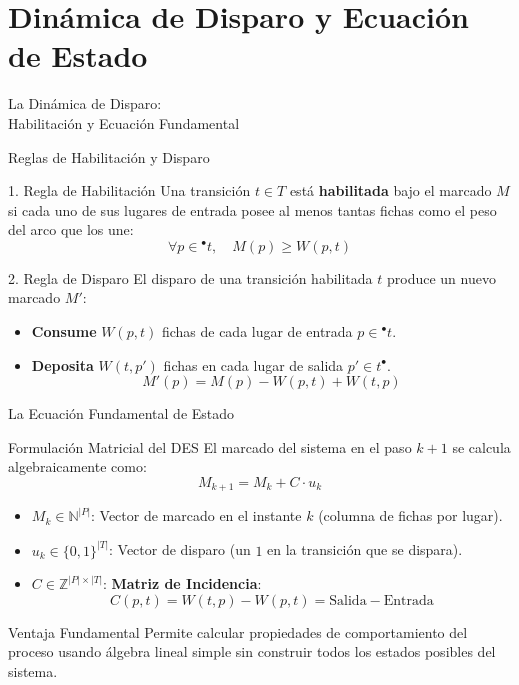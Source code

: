 \documentclass[10pt, aspectratio=169]{beamer}
\begin{document}
\section{Dinámica de Disparo y Ecuación de Estado}

\begin{frame}{}
	\centering
	\Huge{La Dinámica de Disparo: \\ Habilitación y Ecuación Fundamental}
\end{frame}

\begin{frame}{Reglas de Habilitación y Disparo}
	\begin{block}{1. Regla de Habilitación}
		Una transición $t \in T$ está \textbf{habilitada} bajo el marcado $M$ si cada uno de sus lugares de entrada posee al menos tantas fichas como el peso del arco que los une:
		\[ \forall p \in {}^\bullet t, \quad M(p) \ge W(p, t) \]
	\end{block}

	\begin{block}{2. Regla de Disparo}
		El disparo de una transición habilitada $t$ produce un nuevo marcado $M'$:
		\begin{itemize}
			\item \textbf{Consume} $W(p, t)$ fichas de cada lugar de entrada $p \in {}^\bullet t$.
			\item \textbf{Deposita} $W(t, p')$ fichas en cada lugar de salida $p' \in t^\bullet$.
			\[ M'(p) = M(p) - W(p, t) + W(t, p) \]
		\end{itemize}
	\end{block}
\end{frame}

\begin{frame}{La Ecuación Fundamental de Estado}
	\begin{block}{Formulación Matricial del DES}
		El marcado del sistema en el paso $k+1$ se calcula algebraicamente como:
		\[ M_{k+1} = M_k + C \cdot u_k \]
		\begin{itemize}
			\item $M_k \in \mathbb{N}^{|P|}$: Vector de marcado en el instante $k$ (columna de fichas por lugar).
			\item $u_k \in \{0, 1\}^{|T|}$: Vector de disparo (un $1$ en la transición que se dispara).
			\item $C \in \mathbb{Z}^{|P| \times |T|}$: \textbf{Matriz de Incidencia}:
			\[ C(p, t) = W(t, p) - W(p, t) = \text{Salida} - \text{Entrada} \]
		\end{itemize}
	\end{block}

	\begin{exampleblock}{Ventaja Fundamental}
		Permite calcular propiedades de comportamiento del proceso usando álgebra lineal simple sin construir todos los estados posibles del sistema.
	\end{exampleblock}
\end{frame}
\end{document}
